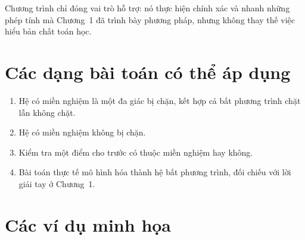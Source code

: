 \documentclass[12pt,a4paper]{report}
\newenvironment{luuybox}{\begin{warningbox}}{\end{warningbox}}
\begin{document}
\begin{luuybox}
Chương trình chỉ đóng vai trò hỗ trợ: nó thực hiện chính xác và nhanh những phép tính mà Chương~1 đã trình bày phương pháp, nhưng không thay thế việc hiểu bản chất toán học.
\end{luuybox}

\section{Các dạng bài toán có thể áp dụng}
\label{sec:3.2}

\begin{enumerate}[label=\textit{Dạng \arabic*.}]
  \item Hệ có miền nghiệm là một đa giác bị chặn, kết hợp cả bất phương trình chặt lẫn không chặt.
  \item Hệ có miền nghiệm không bị chặn.
  \item Kiểm tra một điểm cho trước có thuộc miền nghiệm hay không.
  \item Bài toán thực tế mô hình hóa thành hệ bất phương trình, đối chiếu với lời giải tay ở Chương~1.
\end{enumerate}

\section{Các ví dụ minh họa}
\label{sec:3.3}
\end{document}

